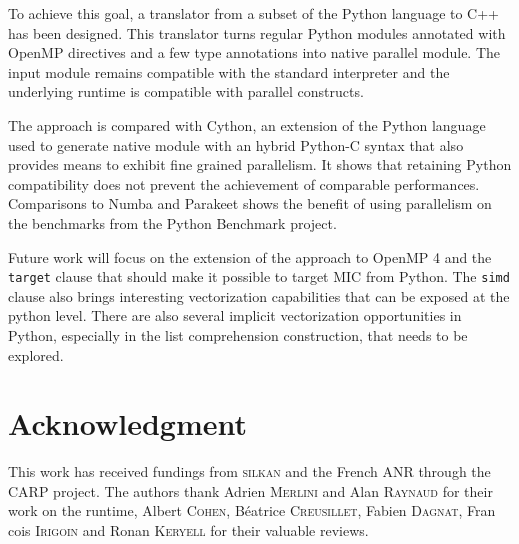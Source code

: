 \documentclass[conference]{IEEEtran}
\begin{document}
To achieve this goal, a translator from a subset of the Python language to C++
has been designed. This translator turns regular Python modules annotated with
OpenMP directives and a few type annotations into native parallel module. The
input module remains compatible with the standard interpreter and the underlying
runtime is compatible with parallel constructs.

The approach is compared with Cython, an extension of the Python language used
to generate native module with an hybrid Python-C syntax that also provides
means to exhibit fine grained parallelism. It shows that retaining Python
compatibility does not prevent the achievement of comparable performances.
Comparisons to Numba and Parakeet shows the benefit of using parallelism on the
benchmarks from the Python Benchmark project.

Future work will focus on the extension of the approach to OpenMP 4 and the
\texttt{target} clause that should make it possible to target MIC from Python.
The \texttt{simd} clause also brings interesting vectorization capabilities that
can be exposed at the python level.  There are also several implicit vectorization
opportunities in Python, especially in the list comprehension construction, that
needs to be explored.

\section*{Acknowledgment}

This work has received fundings from \textsc{silkan} and the French ANR through
the CARP project. The authors thank Adrien \textsc{Merlini} and Alan
\textsc{Raynaud} for their work on the runtime, Albert \textsc{Cohen},
B{\'e}atrice \textsc{Creusillet}, Fabien \textsc{Dagnat}, Fran{\,c}ois
\textsc{Irigoin} and Ronan \textsc{Keryell} for their valuable reviews.



\end{document}
